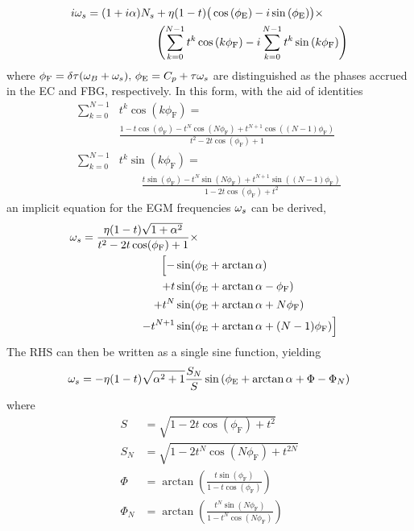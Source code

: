 %
\begin{align*}
    i \omega_s = (1+i \alpha) N_s &+ \eta (1-t) \big(\cos{(\phi_\text{E})} -i\sin{(\phi_\text{E})}  \big) \times \\ 
             &\left( \sum_{k=0}^{N-1} t^k \cos{(k\phi_\text{F})} - i \sum_{k=0}^{N-1} t^k \sin{(k\phi_\text{F})} \right)
\end{align*}
%
where $\phi_\text{F} = \delta \tau(\omega_B + \omega_s), \, \phi_\text{E} = C_p+\tau \omega_s$ are distinguished as the phases accrued in the EC and FBG, respectively. In this form, with the aid of identities
%
\begin{align*}
    \sum_{k=0}^{N-1} &t^k \cos(k\phi_\text{F}) = \\
    &   \frac{1 - t \cos(\phi_\text{F}) - t^N \cos(N\phi_\text{F}) + t^{N+1} \cos((N-1)\phi_\text{F})}{t^2 - 2t \cos(\phi_\text{F}) + 1} \\
    \sum_{k=0}^{N-1} &t^k \sin(k\phi_\text{F}) = \\
    &\quad \quad \frac{t \sin(\phi_\text{F}) - t^N \sin(N\phi_\text{F}) + t^{N+1} \sin((N-1)\phi_\text{F})}{1 - 2t \cos(\phi_\text{F}) + t^2}
\end{align*}
%
an implicit equation for the EGM frequencies $\omega_s$ can be derived,
%
\begin{gather*}
    \begin{aligned}
\w_s = \frac{\eta (1-t) \sqrt{1 + \a^2}}{t^2 - 2 t  \cos(\phi_\text{F}) + 1} \times \\
&&\hspace{-6em} \Big[- &\sin(\phi_\text{E} + \arctan\a) \\
&&\hspace{-6em}      +  t&\sin(\phi_\text{E} + \arctan\a - \phi_\text{F}) \\
&&\hspace{-6em}      + t^N&\sin(\phi_\text{E} + \arctan\a + N \phi_\text{F})   \\
&&\hspace{-6em}      -  t^{N+1}&\sin(\phi_\text{E} + \arctan\a + (N-1) \phi_\text{F})
\Big]
    \end{aligned}
\end{gather*}
%
The RHS can then be written as a single sine function, yielding
%
\begin{equation}
    \label{eq:discretised_ws}
    \omega_s = -\eta (1-t) \sqrt{\alpha^2+1}\frac{S_N}{S} \sin{\left( \phi_\text{E}+\arctan\alpha+ \Phi - \Phi_N  \right)}
\end{equation}
%
where
%
\begin{align}
    S &= \sqrt{1 - 2 t \cos{(\phi_\text{F}) + t^2}}
    \\
    S_N &= \sqrt{1 - 2 t^N \cos{(N\phi_\text{F}) + t^{2N}}}
    \\
    \Phi &= \arctan{\left( \frac{t \sin{(\phi_\text{F})}}{1 - t \cos{(\phi_\text{F})}} \right)} 
    \\
    \Phi_N &= \arctan{\left( \frac{t^N \sin{(N\phi_\text{F})}}{1 - t^N \cos{(N\phi_\text{F})}} \right)} 
\end{align}
